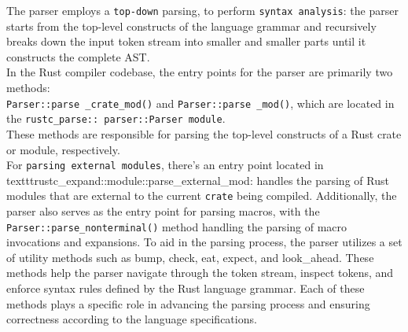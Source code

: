 \documentclass{article}
\begin{document}
The parser employs a \texttt{top-down} parsing, to perform \texttt{syntax analysis}: the parser starts from the top-level constructs of the language grammar and recursively breaks down the input token stream into smaller and smaller parts until it constructs the complete AST.\\
In the Rust compiler codebase, the entry points for the parser are primarily two methods: \\\texttt{Parser::parse \_crate\_mod()} and \texttt{Parser::parse \_mod()}, which are located in the \texttt{rustc\_parse:: parser::Parser module}. \\These methods are responsible for parsing the top-level constructs of a Rust crate or module, respectively.\\For \texttt{parsing external modules}, there's an entry point located in texttt{rustc\_expand::module::parse\_external\_mod}: handles the parsing of Rust modules that are external to the current \texttt{crate} being compiled. Additionally, the parser also serves as the entry point for parsing macros, with the \texttt{Parser::parse\_nonterminal()} method handling the parsing of macro invocations and expansions.
To aid in the parsing process, the parser utilizes a set of utility methods such as bump, check, eat, expect, and look\_ahead. These methods help the parser navigate through the token stream, inspect tokens, and enforce syntax rules defined by the Rust language grammar. Each of these methods plays a specific role in advancing the parsing process and ensuring correctness according to the language specifications.
\end{document}
